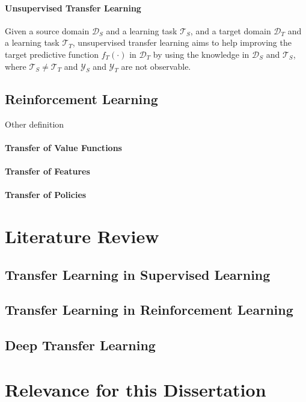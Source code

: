 \paragraph{Unsupervised Transfer Learning}

\begin{definition}
	Given a source domain $\mathcal{D}_S$ and a learning task $\mathcal{T}_S$, and a target domain $\mathcal{D}_T$ and a learning task $\mathcal{T}_T$, unsupervised transfer learning aims to help improving the target predictive function $f_T(\cdot)$ in $\mathcal{D}_T$ by using the knowledge in $\mathcal{D}_S$ and $\mathcal{T}_S$, where $\mathcal{T}_S \neq \mathcal{T}_T$ and $\mathcal{Y}_S$ and $\mathcal{Y}_T$ are not observable. 
\end{definition}




\subsection{Reinforcement Learning}

\begin{definition}
Other definition

\end{definition}


\paragraph{Transfer of Value Functions}
\paragraph{Transfer of Features}
\paragraph{Transfer of Policies}

\section{Literature Review}
\label{sec:literature_review}

\subsection{Transfer Learning in Supervised Learning}
\subsection{Transfer Learning in Reinforcement Learning}
\subsection{Deep Transfer Learning}

\section{Relevance for this Dissertation}
\label{sec:relevance}
